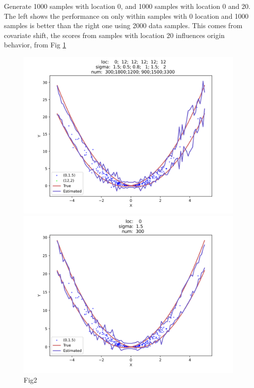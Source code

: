 \documentclass[12pt, a4paper, oneside]{article}
\begin{document}
    Generate 1000 samples with location 0, and 1000 samples with location 0 and 20. The left shows the performance on only within samples with 0 location and 1000 samples is better than the right one using 2000 data samples. This comes from covariate shift, the scores from samples with location 20 influences origin behavior, from Fig \ref{Fig2}
    \begin{figure}[htbp]
        \centering
        \begin{minipage}{0.495\linewidth}
            \centering
            \includegraphics[width=0.98\linewidth]{fig/Ex1_1/FARFULL.png}
        \end{minipage}
        \begin{minipage}{0.495\linewidth}
            \centering
            \includegraphics[width=0.98\linewidth]{fig/Ex1_1/FARPART.png}
        \end{minipage}
        \caption{Fig2}
        \label{Fig2}
    \end{figure}
\end{document}
